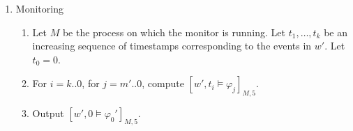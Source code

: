 \begin{enumerate}
	
	\item Monitoring
	\begin{enumerate}[label=\arabic*.]
		\item Let $M$ be the process on which the monitor is running. Let $t_1, \ldots, t_k$ be an increasing sequence of timestamps corresponding to the events in $w'$. Let $t_0 = 0$.
		\item For $i = k .. 0$, for $j = m' .. 0$, compute $[w', t_i \models \varphi_j]_{M,5}$.
		\item Output $[w',0 \models \varphi_0']_{M,5}$.
	\end{enumerate}
\end{enumerate}


